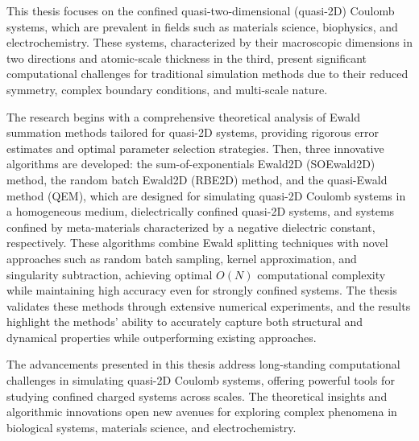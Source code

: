 This thesis focuses on the confined quasi-two-dimensional (quasi-2D) Coulomb systems, which are prevalent in fields such as materials science, biophysics, and electrochemistry. 
These systems, characterized by their macroscopic dimensions in two directions and atomic-scale thickness in the third, present significant computational challenges for traditional simulation methods due to their reduced symmetry, complex boundary conditions, and multi-scale nature.

The research begins with a comprehensive theoretical analysis of Ewald summation methods tailored for quasi-2D systems, providing rigorous error estimates and optimal parameter selection strategies. 
Then, three innovative algorithms are developed: the sum-of-exponentials Ewald2D (SOEwald2D) method, the random batch Ewald2D (RBE2D) method, and the quasi-Ewald method (QEM), which are designed for simulating quasi-2D Coulomb systems in a homogeneous medium, dielectrically confined quasi-2D systems, and systems confined by meta-materials characterized by a negative dielectric constant, respectively.
These algorithms combine Ewald splitting techniques with novel approaches such as random batch sampling, kernel approximation, and singularity subtraction, achieving optimal $O(N)$ computational complexity while maintaining high accuracy even for strongly confined systems.
The thesis validates these methods through extensive numerical experiments, and the results highlight the methods' ability to accurately capture both structural and dynamical properties while outperforming existing approaches.



The advancements presented in this thesis address long-standing computational challenges in simulating quasi-2D Coulomb systems, offering powerful tools for studying confined charged systems across scales. 
The theoretical insights and algorithmic innovations open new avenues for exploring complex phenomena in biological systems, materials science, and electrochemistry.